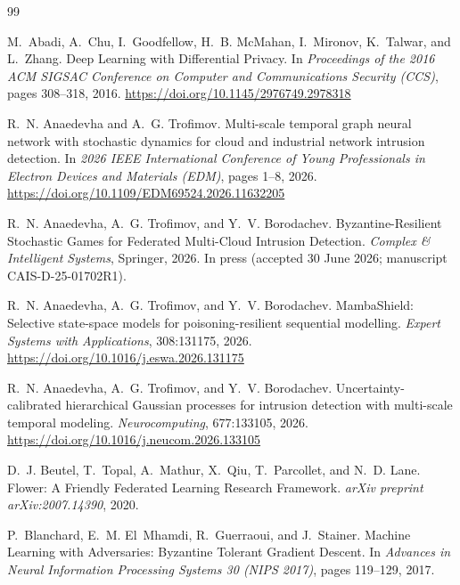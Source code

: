 \documentclass[11pt]{article}
\theoremstyle{plain}
\theoremstyle{definition}
\theoremstyle{remark}
\begin{document}
\begin{thebibliography}{99}
\small

M.~Abadi, A.~Chu, I.~Goodfellow, H.~B. McMahan, I.~Mironov, K.~Talwar, and L.~Zhang.
\newblock Deep Learning with Differential Privacy.
\newblock In \emph{Proceedings of the 2016 ACM SIGSAC Conference on Computer and Communications Security (CCS)}, pages 308--318, 2016.
\newblock \url{https://doi.org/10.1145/2976749.2978318}

R.~N. Anaedevha and A.~G. Trofimov.
\newblock Multi-scale temporal graph neural network with stochastic dynamics for cloud and industrial network intrusion detection.
\newblock In \emph{2026 IEEE International Conference of Young Professionals in Electron Devices and Materials (EDM)}, pages 1--8, 2026.
\newblock \url{https://doi.org/10.1109/EDM69524.2026.11632205}

R.~N. Anaedevha, A.~G. Trofimov, and Y.~V. Borodachev.
\newblock Byzantine-Resilient Stochastic Games for Federated Multi-Cloud Intrusion Detection.
\newblock \emph{Complex \& Intelligent Systems}, Springer, 2026. In press (accepted 30 June 2026; manuscript CAIS-D-25-01702R1).

R.~N. Anaedevha, A.~G. Trofimov, and Y.~V. Borodachev.
\newblock MambaShield: Selective state-space models for poisoning-resilient sequential modelling.
\newblock \emph{Expert Systems with Applications}, 308:131175, 2026.
\newblock \url{https://doi.org/10.1016/j.eswa.2026.131175}

R.~N. Anaedevha, A.~G. Trofimov, and Y.~V. Borodachev.
\newblock Uncertainty-calibrated hierarchical Gaussian processes for intrusion detection with multi-scale temporal modeling.
\newblock \emph{Neurocomputing}, 677:133105, 2026.
\newblock \url{https://doi.org/10.1016/j.neucom.2026.133105}

D.~J. Beutel, T.~Topal, A.~Mathur, X.~Qiu, T.~Parcollet, and N.~D. Lane.
\newblock Flower: A Friendly Federated Learning Research Framework.
\newblock \emph{arXiv preprint arXiv:2007.14390}, 2020.

P.~Blanchard, E.~M. El~Mhamdi, R.~Guerraoui, and J.~Stainer.
\newblock Machine Learning with Adversaries: Byzantine Tolerant Gradient Descent.
\newblock In \emph{Advances in Neural Information Processing Systems 30 (NIPS 2017)}, pages 119--129, 2017.


\end{thebibliography}
\end{document}
